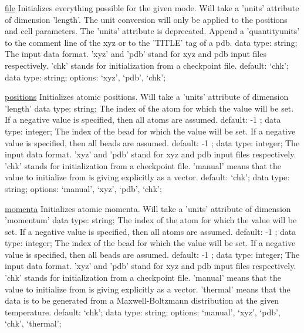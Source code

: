 \begin{ipifield}{}
\begin{ipifield}{\hyperref[INITFILE]{file}}
{Initializes everything possible for the given mode. Will take a 'units' attribute of dimension 'length'. The unit conversion will only be applied to the positions and cell parameters. The 'units' attribute is deprecated. Append a 'quantity{units}' to the comment line of the xyz or to the 'TITLE' tag of a pdb.}%
{data type: string; }%
{%
{The input data format. 'xyz' and 'pdb' stand for xyz and pdb input files respectively. 'chk' stands for initialization from a checkpoint file.}%
{default: `chk'; data type: string; options: `xyz', `pdb', `chk'; }%
}
\end{ipifield}
\begin{ipifield}{\hyperref[INITPOSITIONS]{positions}}%
{Initializes atomic positions. Will take a 'units' attribute of dimension 'length'}%
{data type: string; }%
{%
{The index of the atom for which the value will be set. If a negative value is specified, then all atoms are assumed.}%
{default:  -1 ; data type: integer; }%
%
{The index of the bead for which the value will be set. If a negative value is specified, then all beads are assumed.}%
{default:  -1 ; data type: integer; }%
%
{The input data format. 'xyz' and 'pdb' stand for xyz and pdb input files respectively. 'chk' stands for initialization from a checkpoint file. 'manual' means that the value to initialize from is giving explicitly as a vector.}%
{default: `chk'; data type: string; options: `manual', `xyz', `pdb', `chk'; }%
}
\end{ipifield}
\begin{ipifield}{\hyperref[INITMOMENTA]{momenta}}%
{Initializes atomic momenta. Will take a 'units' attribute of dimension 'momentum'}%
{data type: string; }%
{%
{The index of the atom for which the value will be set. If a negative value is specified, then all atoms are assumed.}%
{default:  -1 ; data type: integer; }%
%
{The index of the bead for which the value will be set. If a negative value is specified, then all beads are assumed.}%
{default:  -1 ; data type: integer; }%
%
{The input data format. 'xyz' and 'pdb' stand for xyz and pdb input files respectively. 'chk' stands for initialization from a checkpoint file. 'manual' means that the value to initialize from is giving explicitly as a vector. 'thermal' means that the data is to be generated from a Maxwell-Boltzmann distribution at the given temperature.}%
{default: `chk'; data type: string; options: `manual', `xyz', `pdb', `chk', `thermal'; }%
}
\end{ipifield}

\end{ipifield}
